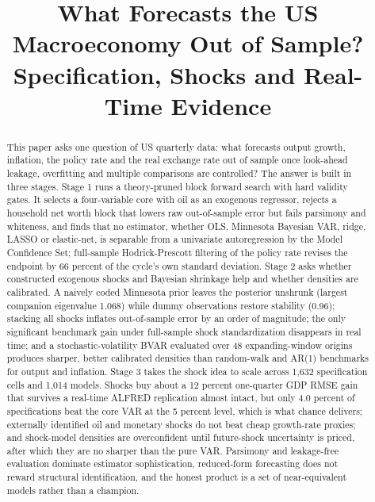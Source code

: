 \documentclass[conference]{IEEEtran}
\begin{document}
\title{What Forecasts the US Macroeconomy Out of Sample?\\ Specification, Shocks and Real-Time Evidence}

\author{
}

\maketitle

\begin{abstract}
This paper asks one question of US quarterly data: what forecasts output growth, inflation, the policy rate and the real exchange rate out of sample once look-ahead leakage, overfitting and multiple comparisons are controlled? The answer is built in three stages. Stage 1 runs a theory-pruned block forward search with hard validity gates. It selects a four-variable core with oil as an exogenous regressor, rejects a household net worth block that lowers raw out-of-sample error but fails parsimony and whiteness, and finds that no estimator, whether OLS, Minnesota Bayesian VAR, ridge, LASSO or elastic-net, is separable from a univariate autoregression by the Model Confidence Set; full-sample Hodrick-Prescott filtering of the policy rate revises the endpoint by 66 percent of the cycle's own standard deviation. Stage 2 asks whether constructed exogenous shocks and Bayesian shrinkage help and whether densities are calibrated. A naively coded Minnesota prior leaves the posterior unshrunk (largest companion eigenvalue 1.068) while dummy observations restore stability (0.96); stacking all shocks inflates out-of-sample error by an order of magnitude; the only significant benchmark gain under full-sample shock standardization disappears in real time; and a stochastic-volatility BVAR evaluated over 48 expanding-window origins produces sharper, better calibrated densities than random-walk and AR(1) benchmarks for output and inflation. Stage 3 takes the shock idea to scale across 1,632 specification cells and 1,014 models. Shocks buy about a 12 percent one-quarter GDP RMSE gain that survives a real-time ALFRED replication almost intact, but only 4.0 percent of specifications beat the core VAR at the 5 percent level, which is what chance delivers; externally identified oil and monetary shocks do not beat cheap growth-rate proxies; and shock-model densities are overconfident until future-shock uncertainty is priced, after which they are no sharper than the pure VAR. Parsimony and leakage-free evaluation dominate estimator sophistication, reduced-form forecasting does not reward structural identification, and the honest product is a set of near-equivalent models rather than a champion.
\end{abstract}
\end{document}
